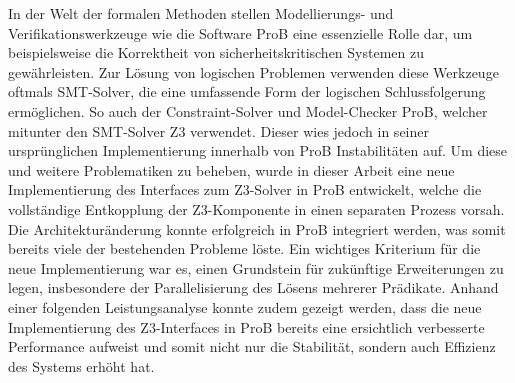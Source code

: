 
In der Welt der formalen Methoden stellen Modellierungs- und Verifikationswerkzeuge wie die Software ProB eine essenzielle Rolle dar,
um beispielsweise die Korrektheit von sicherheitskritischen Systemen zu gewährleisten.
Zur Lösung von logischen Problemen verwenden diese Werkzeuge oftmals SMT-Solver, die eine umfassende Form der logischen Schlussfolgerung ermöglichen.
So auch der Constraint-Solver und Model-Checker ProB, welcher mitunter den SMT-Solver Z3 verwendet.
Dieser wies jedoch in seiner ursprünglichen Implementierung innerhalb von ProB Instabilitäten auf.
Um diese und weitere Problematiken zu beheben, wurde in dieser Arbeit eine neue Implementierung des Interfaces zum Z3-Solver in ProB entwickelt, welche
die vollständige Entkopplung der Z3-Komponente in einen separaten Prozess vorsah.
Die Architekturänderung konnte erfolgreich in ProB integriert werden, was somit bereits viele der bestehenden Probleme löste.
Ein wichtiges Kriterium für die neue Implementierung war es, einen Grundstein für zukünftige Erweiterungen zu legen, insbesondere der Parallelisierung des Lösens mehrerer Prädikate.
Anhand einer folgenden Leistungsanalyse konnte zudem gezeigt werden, dass die neue Implementierung des Z3-Interfaces
in ProB bereits eine ersichtlich verbesserte Performance aufweist und somit nicht nur die Stabilität, sondern auch Effizienz des Systems erhöht hat.
